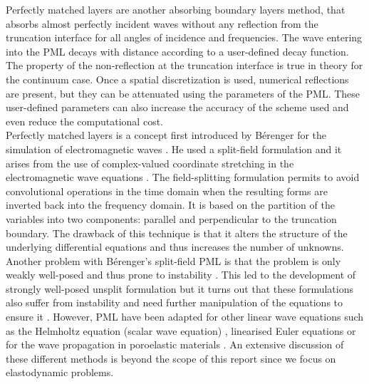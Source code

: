 Perfectly matched layers are another absorbing boundary layers method, that absorbs almost perfectly incident waves without any reflection from the truncation interface for all angles of incidence and frequencies. The wave entering into the PML decays with distance according to a user-defined decay function. The property of the non-reflection at the truncation interface is true in theory for the continuum case. Once a spatial discretization is used, numerical reflections are present, but they can be attenuated using the parameters of the PML. These user-defined parameters can also increase the accuracy of the scheme used and even reduce the computational cost.\\
Perfectly matched layers is a concept first introduced by Bérenger for the simulation of electromagnetic waves \cite{Berenger}. He used a split-field formulation and it arises from the use of complex-valued coordinate stretching in the electromagnetic wave equations \cite{Chew}. The field-splitting formulation permits to avoid convolutional operations in the time domain when the resulting forms are inverted back into the frequency domain. It is based on the partition of the variables into two components: parallel and perpendicular to the truncation boundary. The drawback of this technique is that it alters the structure of the underlying differential equations and thus increases the number of unknowns. Another problem with Bérenger's split-field PML is that the problem is only weakly well-posed and thus prone to instability \cite{Abarbanel2}. This led to the development of strongly well-posed unsplit formulation \cite{Abarbanel1} but it turns out that these formulations also suffer from instability and need further manipulation of the equations to ensure it \cite{Abarbanel3}. However, PML have been adapted for other linear wave equations such as the Helmholtz equation (scalar wave equation) \cite{Qi,Turkel,Harari}, linearised Euler equations \cite{Hu} or for the wave propagation in poroelastic materials \cite{Zeng}. An extensive discussion of these different methods is beyond the scope of this report since we focus on elastodynamic problems. \\
